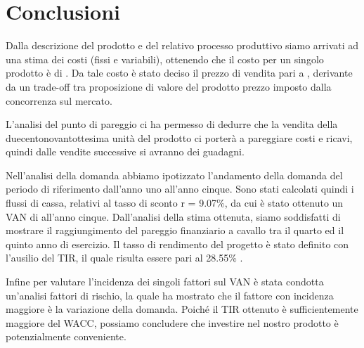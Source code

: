 \section{Conclusioni}
Dalla descrizione del prodotto e del relativo processo produttivo siamo arrivati
ad una stima dei costi (fissi e variabili), ottenendo che il costo per un
singolo prodotto è di . Da tale costo è stato deciso il prezzo di
vendita pari a , derivante da un trade-off tra proposizione di
valore del prodotto prezzo imposto dalla concorrenza sul mercato.

L’analisi del punto di pareggio ci ha permesso di dedurre che la vendita della
duecentonovantottesima unità del prodotto ci porterà a pareggiare costi e
ricavi, quindi dalle vendite successive si avranno dei guadagni.

Nell’analisi della domanda abbiamo ipotizzato l’andamento della domanda del
periodo di riferimento dall’anno uno all’anno cinque. Sono stati calcolati
quindi i flussi di cassa, relativi al tasso di sconto r = 9.07\%, da cui è stato
ottenuto un VAN di   all’anno cinque. Dall’analisi della stima
ottenuta, siamo soddisfatti di mostrare il raggiungimento del pareggio
finanziario a cavallo tra il quarto ed il quinto anno di esercizio.  Il tasso di
rendimento del progetto è stato definito con l’ausilio del TIR, il quale risulta
essere pari al 28.55\% .

Infine per valutare l’incidenza dei singoli fattori sul VAN è stata condotta
un’analisi fattori di rischio, la quale ha mostrato che il fattore con incidenza
maggiore è la variazione della domanda.  Poiché il TIR ottenuto è
sufficientemente maggiore del WACC, possiamo concludere che investire nel nostro
prodotto è potenzialmente conveniente.

